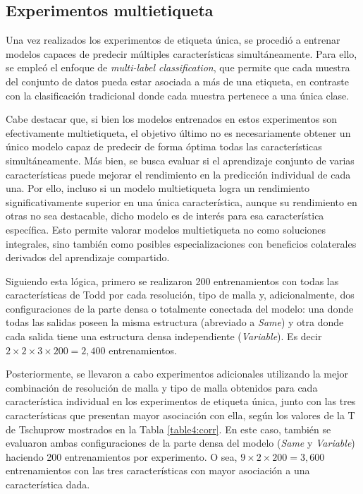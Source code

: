 \subsection{Experimentos multietiqueta}
\label{multi_tag_exps}
Una vez realizados los experimentos de etiqueta única, se procedió a entrenar modelos capaces de predecir múltiples características simultáneamente. Para ello, se empleó el enfoque de \textit{multi-label classification}, que permite que cada muestra del conjunto de datos pueda estar asociada a más de una etiqueta, en contraste con la clasificación tradicional donde cada muestra pertenece a una única clase. 

Cabe destacar que, si bien los modelos entrenados en estos experimentos son efectivamente multietiqueta, el objetivo último no es necesariamente obtener un único modelo capaz de predecir de forma óptima todas las características simultáneamente. Más bien, se busca evaluar si el aprendizaje conjunto de varias características puede mejorar el rendimiento en la predicción individual de cada una. Por ello, incluso si un modelo multietiqueta logra un rendimiento significativamente superior en una única característica, aunque su rendimiento en otras no sea destacable, dicho modelo es de interés para esa característica específica. Esto permite valorar modelos multietiqueta no como soluciones integrales, sino también como posibles especializaciones con beneficios colaterales derivados del aprendizaje compartido.

Siguiendo esta lógica, primero se realizaron 200 entrenamientos con todas las características de Todd por cada resolución, tipo de malla y, adicionalmente, dos configuraciones de la parte densa o totalmente conectada del modelo: una donde todas las salidas poseen la misma estructura (abreviado a \textit{Same}) y otra donde cada salida tiene una estructura densa independiente (\textit{Variable}). Es decir $2 \times 2 \times 3 \times 200 = 2,400$ entrenamientos.

Posteriormente, se llevaron a cabo experimentos adicionales utilizando la mejor combinación de resolución de malla y tipo de malla obtenidos para cada característica individual en los experimentos de etiqueta única, junto con las tres características que presentan mayor asociación con ella, según los valores de la T de Tschuprow mostrados en la Tabla \ref{table4:corr}. En este caso, también se evaluaron ambas configuraciones de la parte densa del modelo (\textit{Same} y \textit{Variable}) haciendo 200 entrenamientos por experimento. O sea, $9 \times 2 \times 200 = 3,600$ entrenamientos con las tres características con mayor asociación a una característica dada.

